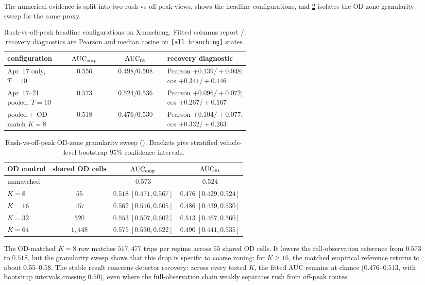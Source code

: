 The numerical evidence is split into two rush-vs-off-peak views.
 shows the headline configurations, and
\cref{tab:phase5-ksweep} isolates the OD-zone granularity sweep for the
same proxy.

\begin{table}[!htbp]
\centering
\caption{Rush-vs-off-peak headline configurations on Xuancheng. Fitted
columns report /; recovery
diagnostics are Pearson and median cosine on \texttt{[all branching]}
states.}
\label{tab:phase5-headline}
\scriptsize
\setlength{\tabcolsep}{3pt}
\begin{tabular}{@{}p{0.24\linewidth}ccp{0.34\linewidth}@{}}
\toprule
configuration & $\mathrm{AUC}_{\mathrm{emp}}$ & $\mathrm{AUC}_{\mathrm{fit}}$ & recovery diagnostic \\
\midrule
Apr~17 only, $T=10$ & $0.556$ & $0.498 / 0.508$ &
Pearson $+0.139/+0.048$; cos $+0.341/+0.146$ \\
Apr~17--21 pooled, $T=10$ & $0.573$ & $0.524 / 0.536$ &
Pearson $+0.096/+0.072$; cos $+0.267/+0.167$ \\
pooled + OD-match $K=8$ & $0.518$ & $0.476 / 0.530$ &
Pearson $+0.104/+0.077$; cos $+0.332/+0.263$ \\
\bottomrule
\end{tabular}
\end{table}

\begin{table}[!htbp]
\centering
\caption{Rush-vs-off-peak OD-zone granularity sweep
(). Brackets give stratified vehicle-level bootstrap
$95\%$ confidence intervals.}
\label{tab:phase5-ksweep}
\small
\begin{tabular}{lccc}
\toprule
OD control & shared OD cells & $\mathrm{AUC}_{\mathrm{emp}}$ & $\mathrm{AUC}_{\mathrm{fit}}$ \\
\midrule
unmatched & -- & $0.573$ & $0.524$ \\
$K=8$  & $55$    & $0.518\ [0.471,0.567]$ & $0.476\ [0.429,0.524]$ \\
$K=16$ & $157$   & $0.562\ [0.516,0.605]$ & $0.486\ [0.439,0.530]$ \\
$K=32$ & $520$   & $0.553\ [0.507,0.602]$ & $0.513\ [0.467,0.560]$ \\
$K=64$ & $1{,}448$ & $0.575\ [0.530,0.622]$ & $0.490\ [0.441,0.535]$ \\
\bottomrule
\end{tabular}
\end{table}

The OD-matched $K=8$ row matches $517{,}477$ trips per regime across
$55$ shared OD cells. It lowers the full-observation reference from
$0.573$ to $0.518$, but the granularity sweep shows that this drop is
specific to coarse zoning: for $K\ge16$, the matched empirical reference
returns to about $0.55$--$0.58$. The stable result concerns detector
recovery: across every tested $K$, the fitted AUC remains at chance
($0.476$--$0.513$, with bootstrap intervals crossing $0.50$), even where
the full-observation chain weakly separates rush from off-peak routes.

